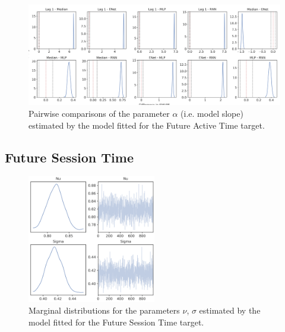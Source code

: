 \begin{figure}[H]
\centering
\includegraphics[width=\textwidth]{images/appendix_C/Future_Active_Time_comp_2.png}
\caption[\textbf{Future active time pairwise comparisons of model fixed effect}]{Pairwise comparisons of the parameter $\alpha$ (i.e. model slope) estimated by the model fitted for the Future Active Time target.}
\label{comp_act_2}
\end{figure}

\subsection{Future Session Time}
\label{future_sess_bayes_2}

\begin{figure}[H]
\centering
\includegraphics[width=0.5\textwidth]{images/appendix_C/Future Session Time_marginals_2.png}
\caption[\textbf{Future session time marginal distributions}]{Marginal distributions for the parameters $\nu$, $\sigma$ estimated by the model fitted for the Future Session Time target.}
\label{marginals_sess_2}
\end{figure}

